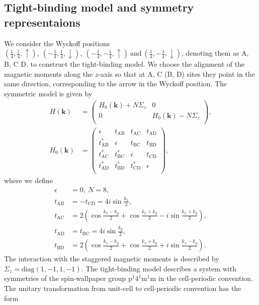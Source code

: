 \documentclass[aps,preprintnumbers,amsmath,amssymb]{revtex4-2}
\begin{document}
\subsection{Tight-binding model and symmetry representaions}\label{appendix_symRep}
We consider the Wyckoff positions $(\tfrac{1}{4},\tfrac{1}{4}, \uparrow), \ (-\tfrac{1}{4},\tfrac{1}{4}, \downarrow), \ (-\tfrac{1}{4},-\tfrac{1}{4}, \uparrow) \ \text{and} \ (\tfrac{1}{4},-\tfrac{1}{4}, \downarrow)$, denoting them as A, B, C  D, to construct the tight-binding model. We choose the alignment of the magnetic moments along the $z$-axis so that at A, C (B, D) sites they point in the same direction, corresponding to the arrow in the Wyckoff position. The symmetric model is given by
\begin{align}
    H(\mathbf{k}) &= \begin{pmatrix}
        H_0(\mathbf{k}) + N \Sigma_z&0\\
        0 & H_0(\mathbf{k}) - N \Sigma_z\\
    \end{pmatrix},\\
    H_0(\mathbf{k}) &=  \begin{pmatrix}
        \epsilon&t_{\text{AB}}&t_{\text{AC}}&t_{\text{AD}}\\
        t_{\text{AB}}^* & \epsilon&t_{\text{BC}}&t_{\text{BD}}\\
        t_{\text{AC}}^* & t_{\text{BC}}^*&\epsilon&t_{\text{CD}}\\
        t_{\text{AD}}^* & t_{\text{BD}}^*&t_{\text{CD}}^*&\epsilon\\
    \end{pmatrix},
\end{align}
where we define
\begin{align}
    \epsilon &=0,\  N = 8,\\ 
    t_{\text{AB}}&=-t_{\text{CD}}=4i\sin\tfrac{k_x}{2},\\
    t_{\text{AC}}&=2(\cos\tfrac{k_x-k_y}{2} + \cos\tfrac{k_x+k_y}{2} - i \sin\tfrac{k_x+k_y}{2}),\\
    t_{\text{AD}}&=t_{\text{BC}}=4i \sin\tfrac{k_y}{2}, \\
    t_{\text{BD}}&=2(\cos\tfrac{k_x-k_y}{2} + \cos\tfrac{k_x+k_y}{2} + i \sin\tfrac{k_x-k_y}{2}).
\end{align}
The interaction with the staggered magnetic moments is described by $\Sigma_z = \text{diag} (1, -1, 1, -1)$.
The tight-binding model describes a system with symmetries of the spin-wallpaper group p$^{\overline{1}}$4$^{\overline{1}}$m$^1$m in the cell-periodic convention. The unitary transformation from unit-cell to cell-periodic convention has the form
\end{document}
